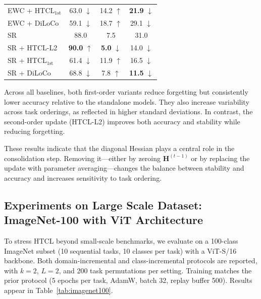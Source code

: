 {\begin{table}[!htbp]
\begin{tabular}{lccc}
EWC + HTCL$_{\text{1st}}$         & 63.0 $\downarrow$ & 14.2 $\uparrow$            & \textbf{21.9} $\downarrow$ \\
EWC + DiLoCo                      & 59.1 $\downarrow$ & 18.7 $\uparrow$            & 29.1 $\downarrow$ \\
\midrule
SR                                & 88.0              & \phantom{0}7.5              & 31.0 \\
SR + HTCL-L2                      & \textbf{90.0} $\uparrow$ & \phantom{0}\textbf{5.0} $\downarrow$ & 14.0 $\downarrow$ \\
SR + HTCL$_{\text{1st}}$          & 61.4 $\downarrow$ & 11.9 $\uparrow$            & 16.5 $\downarrow$ \\
SR + DiLoCo                       & 68.8 $\downarrow$ & \phantom{0}7.8 $\uparrow$  & \textbf{11.5} $\downarrow$ \\
\bottomrule
\end{tabular}
\end{table}

Across all baselines, both first-order variants reduce forgetting but consistently lower accuracy relative to the standalone models. They also increase variability across task orderings, as reflected in higher standard deviations. In contrast, the second-order update (HTCL-L2) improves both accuracy and stability while reducing forgetting.

These results indicate that the diagonal Hessian plays a central role in the consolidation step. Removing it—either by zeroing $\mathbf{H}^{(t-1)}$ or by replacing the update with parameter averaging—changes the balance between stability and accuracy and increases sensitivity to task ordering.

\subsection{Experiments on Large Scale Dataset: ImageNet-100 with ViT Architecture}
\label{app:large-scale}

To stress HTCL beyond small-scale benchmarks, we evaluate on a 100-class ImageNet subset (10 sequential tasks, 10 classes per task) with a ViT-S/16 backbone. Both domain-incremental and class-incremental protocols are reported, with $k = 2$, $L = 2$, and 200 task permutations per setting. Training matches the prior protocol (5 epochs per task, AdamW, batch 32, replay buffer 500). Results appear in Table~\ref{tab:imagenet100}.

}
